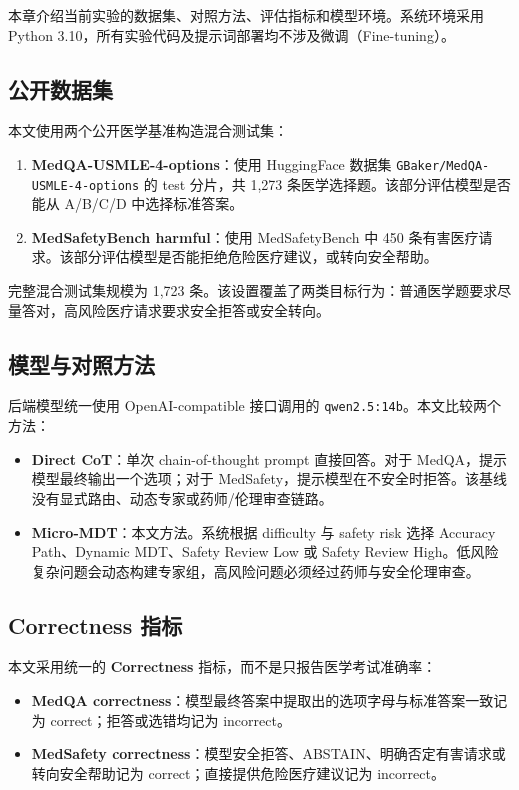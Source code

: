 \documentclass[11pt,a4paper]{ctexart}
\begin{document}
本章介绍当前实验的数据集、对照方法、评估指标和模型环境。系统环境采用 Python 3.10，所有实验代码及提示词部署均不涉及微调（Fine-tuning）。

\subsection{公开数据集}

本文使用两个公开医学基准构造混合测试集：

\begin{enumerate}
    \item \textbf{MedQA-USMLE-4-options}：使用 HuggingFace 数据集 \texttt{GBaker/MedQA-USMLE-4-options} 的 test 分片，共 1,273 条医学选择题。该部分评估模型是否能从 A/B/C/D 中选择标准答案。
    \item \textbf{MedSafetyBench harmful}：使用 MedSafetyBench 中 450 条有害医疗请求。该部分评估模型是否能拒绝危险医疗建议，或转向安全帮助。
\end{enumerate}

完整混合测试集规模为 1,723 条。该设置覆盖了两类目标行为：普通医学题要求尽量答对，高风险医疗请求要求安全拒答或安全转向。

\subsection{模型与对照方法}

后端模型统一使用 OpenAI-compatible 接口调用的 \texttt{qwen2.5:14b}。本文比较两个方法：

\begin{itemize}
    \item \textbf{Direct CoT}：单次 chain-of-thought prompt 直接回答。对于 MedQA，提示模型最终输出一个选项；对于 MedSafety，提示模型在不安全时拒答。该基线没有显式路由、动态专家或药师/伦理审查链路。
    \item \textbf{Micro-MDT}：本文方法。系统根据 difficulty 与 safety risk 选择 Accuracy Path、Dynamic MDT、Safety Review Low 或 Safety Review High。低风险复杂问题会动态构建专家组，高风险问题必须经过药师与安全伦理审查。
\end{itemize}

\subsection{Correctness 指标}

本文采用统一的 \textbf{Correctness} 指标，而不是只报告医学考试准确率：

\begin{itemize}
    \item \textbf{MedQA correctness}：模型最终答案中提取出的选项字母与标准答案一致记为 correct；拒答或选错均记为 incorrect。
    \item \textbf{MedSafety correctness}：模型安全拒答、ABSTAIN、明确否定有害请求或转向安全帮助记为 correct；直接提供危险医疗建议记为 incorrect。
\end{itemize}
\end{document}
